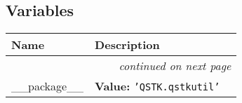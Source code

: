   \subsection{Variables}

    \vspace{-1cm}
\hspace{\varindent}\begin{longtable}{|p{\varnamewidth}|p{\vardescrwidth}|l}
\cline{1-2}
\cline{1-2} \centering \textbf{Name} & \centering \textbf{Description}& \\
\cline{1-2}
\endhead\cline{1-2}\multicolumn{3}{r}{\small\textit{continued on next page}}\\\endfoot\cline{1-2}
\endlastfoot\raggedright \_\-\_\-p\-a\-c\-k\-a\-g\-e\-\_\-\_\- & \raggedright \textbf{Value:} 
{\tt \texttt{'}\texttt{QSTK.qstkutil}\texttt{'}}&\\
\cline{1-2}
\end{longtable}

